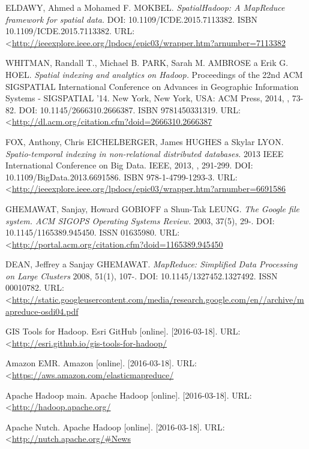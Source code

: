 \documentclass[a4paper,12pt,oneside]{report}
\begin{document}
\begin{thebibliography}{99}
ELDAWY, Ahmed a Mohamed F. MOKBEL. \textit{SpatialHadoop: A MapReduce framework for spatial data.} DOI: 10.1109/ICDE.2015.7113382. ISBN 10.1109/ICDE.2015.7113382. URL:  \textless\url{http://ieeexplore.ieee.org/lpdocs/epic03/wrapper.htm?arnumber=7113382}

WHITMAN, Randall T., Michael B. PARK, Sarah M. AMBROSE a Erik G. HOEL. \textit{Spatial indexing and analytics on Hadoop.} Proceedings of the 22nd ACM SIGSPATIAL International Conference on Advances in Geographic Information Systems - SIGSPATIAL '14. New York, New York, USA: ACM Press, 2014, , 73-82. DOI: 10.1145/2666310.2666387. ISBN 9781450331319. URL:  \textless\url{http://dl.acm.org/citation.cfm?doid=2666310.2666387}

FOX, Anthony, Chris EICHELBERGER, James HUGHES a Skylar LYON. \textit{Spatio-temporal indexing in non-relational distributed databases.} 2013 IEEE International Conference on Big Data. IEEE, 2013, , 291-299. DOI: 10.1109/BigData.2013.6691586. ISBN 978-1-4799-1293-3. URL:  \textless\url{http://ieeexplore.ieee.org/lpdocs/epic03/wrapper.htm?arnumber=6691586}

GHEMAWAT, Sanjay, Howard GOBIOFF a Shun-Tak LEUNG. \textit{The Google file system. ACM SIGOPS Operating Systems Review.} 2003, 37(5), 29-. DOI: 10.1145/1165389.945450. ISSN 01635980.  URL:  \textless\url{http://portal.acm.org/citation.cfm?doid=1165389.945450}

DEAN, Jeffrey a Sanjay GHEMAWAT. \textit{MapReduce: Simplified Data Processing on Large Clusters}  2008, 51(1), 107-. DOI: 10.1145/1327452.1327492. ISSN 00010782. URL:  \textless\url{http://static.googleusercontent.com/media/research.google.com/en//archive/mapreduce-osdi04.pdf}





GIS Tools for Hadoop. Esri GitHub [online]. [2016-03-18]. URL:  \textless\url{http://esri.github.io/gis-tools-for-hadoop/}

Amazon EMR. Amazon [online]. [2016-03-18]. 
URL: \textless\url{https://aws.amazon.com/elasticmapreduce/}

Apache Hadoop main. Apache Hadoop [online]. [2016-03-18]. 
URL: \textless\url{http://hadoop.apache.org/}

Apache Nutch. Apache Hadoop [online]. [2016-03-18]. 
URL: \textless\url{http://nutch.apache.org/#News
}


\end{thebibliography}
\end{document}
